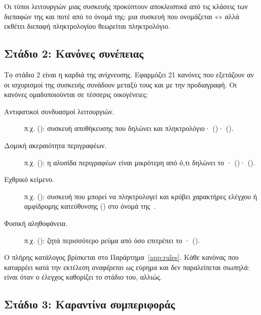 Οι τύποι λειτουργιών μιας συσκευής προκύπτουν \emph{αποκλειστικά} από τις
κλάσεις των διεπαφών της και ποτέ από το όνομά της: μια συσκευή που ονομάζεται
«» αλλά εκθέτει διεπαφή  πληκτρολογίου θεωρείται
πληκτρολόγιο.

\subsection{Στάδιο 2: Κανόνες συνέπειας}
\label{sec:design-stage2}

Το στάδιο 2 είναι η καρδιά της ανίχνευσης. Εφαρμόζει 21 κανόνες που εξετάζουν
αν οι ισχυρισμοί της συσκευής συνάδουν μεταξύ τους και με την προδιαγραφή. Οι
κανόνες ομαδοποιούνται σε τέσσερις οικογένειες:

\begin{description}
  \item[Αντιφατικοί συνδυασμοί λειτουργιών.] π.χ. 
        (\sevC): συσκευή αποθήκευσης που δηλώνει και πληκτρολόγιο·
         (\sevC)· 
        (\sevW).
  \item[Δομική ακεραιότητα περιγραφέων.] π.χ. 
        (\sevC): η αλυσίδα περιγραφέων είναι μικρότερη από ό,τι δηλώνει το
        ·  (\sevC)·
         (\sevW).
  \item[Εχθρικό κείμενο.] π.χ.  (\sevC): συσκευή που
        μπορεί να πληκτρολογεί και κρύβει χαρακτήρες ελέγχου ή αμφίδρομης
        κατεύθυνσης () στο όνομά της~\cite{boucher2023trojansource,unicode-tr9}.
  \item[Φυσική αληθοφάνεια.] π.χ.  (\sevW): ζητά
        περισσότερο ρεύμα από όσο επιτρέπει το ·
         (\sevN).
\end{description}

Ο πλήρης κατάλογος βρίσκεται στο Παράρτημα~\ref{app:rules}. Κάθε κανόνας που
καταρρέει κατά την εκτέλεση \emph{αναφέρεται} ως εύρημα
 και δεν παραλείπεται σιωπηλά: είναι \sevC{} όταν
ο έλεγχος καθορίζει το στάδιο του, \sevN{} αλλιώς.

\subsection{Στάδιο 3: Καραντίνα συμπεριφοράς}
\label{sec:design-stage3}

